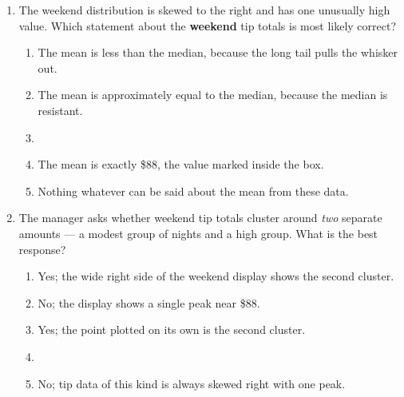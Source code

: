 \documentclass[12pt]{article}
\begin{document}
\begin{enumerate}[leftmargin=1.9em, itemsep=0.13in]
  \item The weekend distribution is skewed to the right and has one unusually high value. Which
        statement about the \textbf{weekend} tip totals is most likely correct?
        \begin{enumerate}[label=\textbf{(\Alph*)}, leftmargin=2.2em, itemsep=2pt]
          \item The mean is less than the median, because the long tail pulls the whisker out.
          \item The mean is approximately equal to the median, because the median is resistant.
          \item {}
          \item The mean is exactly \$88, the value marked inside the box.
          \item Nothing whatever can be said about the mean from these data.
                \hfill{}
        \end{enumerate}

  \item The manager asks whether weekend tip totals cluster around \emph{two} separate amounts
        --- a modest group of nights and a high group. What is the best response?
        \begin{enumerate}[label=\textbf{(\Alph*)}, leftmargin=2.2em, itemsep=2pt]
          \item Yes; the wide right side of the weekend display shows the second cluster.
          \item No; the display shows a single peak near \$88.
          \item Yes; the point plotted on its own is the second cluster.
          \item {}
          \item No; tip data of this kind is always skewed right with one peak.
                \hfill{}
        \end{enumerate}

\end{enumerate}
\end{document}
